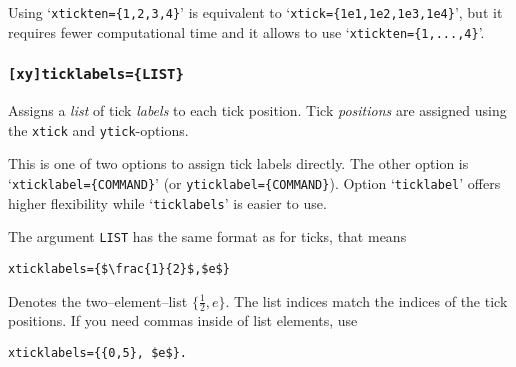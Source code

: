 Using `\texttt{xtickten=\{1,2,3,4\}}' is equivalent to `\texttt{xtick=\{1e1,1e2,1e3,1e4\}}', but it requires fewer computational time and it allows to use `\texttt{xtickten=\{1,...,4\}}'.

\subsubsection{\texttt{[xy]ticklabels=\{LIST\}}}
Assigns a \emph{list} of tick \emph{labels} to each tick position. Tick \emph{positions} are assigned using the \texttt{xtick} and \texttt{ytick}-options.

This is one of two options to assign tick labels directly. The other option is `\texttt{xticklabel=\{COMMAND\}}' (or \texttt{yticklabel=\{COMMAND\}}).
Option `\texttt{\*ticklabel}' offers higher flexibility while `\texttt{\*ticklabels}' is easier to use.

The argument \texttt{LIST} has the same format as for ticks, that means
\begin{lstlisting}
xticklabels={$\frac{1}{2}$,$e$}
\end{lstlisting}
Denotes the two--element--list $\{\frac 12, e\}$. The list indices match the indices of the tick positions. If you need commas inside of list elements, use 
\begin{lstlisting}
xticklabels={{0,5}, $e$}.
\end{lstlisting}



